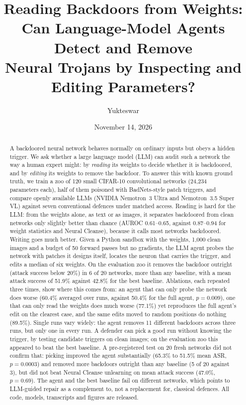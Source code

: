 \documentclass[11pt]{article}
\title{\textbf{Reading Backdoors from Weights:\\Can Language-Model Agents Detect and Remove\\Neural Trojans by Inspecting and Editing Parameters?}}
\author{Yukteswar}
\date{November 14, 2026}
\begin{document}
\maketitle
\thispagestyle{fancy}

\begin{abstract}
A backdoored neural network behaves normally on ordinary inputs but obeys a hidden trigger. We ask
whether a large language model (LLM) can audit such a network the way a human expert might: by
\emph{reading} its weights to decide whether it is backdoored, and by \emph{editing} its weights to
remove the backdoor. To answer this with known ground truth, we train a zoo of 120 small CIFAR-10
convolutional networks (24{,}234 parameters each), half of them poisoned with BadNets-style patch
triggers, and compare openly available LLMs (NVIDIA Nemotron~3 Ultra and Nemotron~3.5 Super VL)
against seven conventional defences under matched access. Reading is hard for the LLM: from the
weights alone, as text or as images, it separates backdoored from clean networks only slightly
better than chance (AUROC 0.61--0.65, against 0.87--0.94 for weight statistics and Neural Cleanse),
because it calls most networks backdoored. Writing goes much better. Given a Python sandbox with the
weights, 1{,}000 clean images and a budget of 50 forward passes but no gradients, the LLM agent
probes the network with patches it designs itself, locates the neuron that carries the trigger, and
edits a median of six weights. On the evaluation zoo it removes the backdoor outright (attack success
below 20\%) in 6 of 20 networks, more than any baseline, with a mean attack success of 51.9\% against
42.8\% for the best baseline. Ablations, each repeated three times, show where this comes from: an agent that can only
probe the network does worse (60.4\% averaged over runs, against 50.4\% for the full agent, $p=0.009$),
one that can only read the weights does much worse (77.1\%) yet reproduces the full agent's edit on
the clearest case, and the same edits moved to random positions do nothing (89.5\%). Single runs vary
widely: the agent removes 11 different backdoors across three runs, but only one in every run. A
defender can pick a good run without knowing the trigger, by testing candidate triggers on clean
images; on the evaluation zoo this appeared to beat the best baseline. A pre-registered test on 20 fresh
networks did not confirm that: picking improved the agent substantially (65.3\% to 51.5\% mean ASR,
$p=0.0003$) and removed more backdoors outright than any baseline (5 of 20 against 3), but did not beat
Neural Cleanse unlearning on mean attack success (47.0\%, $p=0.69$). The agent and the best baseline fail
on different networks, which points to LLM-guided repair as a complement to, not a replacement for,
classical defences. All code, models, transcripts and figures are released.
\end{abstract}
\end{document}
